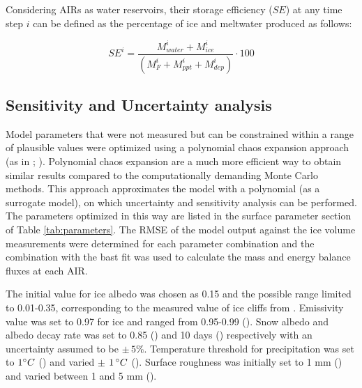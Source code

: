 \documentclass[utf8]{frontiersSCNS} %
\begin{document}
 Considering AIRs as water reservoirs, their storage efficiency ($SE$) at any time step $i$ can be defined as the
 percentage of ice and meltwater produced as follows:

\begin{equation} \textit{SE}^i = \frac{M_{water}^i+M_{ice}^i}{(M_F^i+M_{ppt}^i+M_{dep}^i)} \cdot 100 \end{equation}


\subsection{Sensitivity and Uncertainty analysis}
Model parameters that were not measured but can be constrained within a range of plausible values were optimized using a
polynomial chaos expansion approach (as in \cite{uncertainpy_2018}; \cite{Xiu_2005}). Polynomial chaos expansion are a
much more efficient way to obtain similar results compared to the computationally demanding Monte Carlo methods. This
approach approximates the model with a polynomial (as a surrogate model), on which uncertainty and sensitivity analysis
can be performed. The parameters optimized in this way are listed in the surface parameter section of Table
\ref{tab:parameters}. The RMSE of the model output against the ice volume measurements were determined for each
parameter combination and the combination with the bast fit was used to calculate the mass and energy balance fluxes at
each AIR.

The initial value for ice albedo was chosen as 0.15 and the possible range limited to 0.01-0.35, corresponding to the
measured value of ice cliffs from \cite{steiner_2015}. Emissivity value was set to 0.97 for ice and ranged from
0.95-0.99 (\cite{steiner_2015}). Snow albedo and albedo decay rate was set to 0.85 (\cite{CuffeyPaterson_2010}) and 10
days (\cite{Schmidt_2017}) respectively with an uncertainty assumed to be $\pm \,5 \%$. Temperature threshold for
precipitation was set to $1 \degree C$ (\cite{FujitaAgeta_2000}) and varied $\pm$ $1\,\degree C$ (\cite{Zhou_2010}).
Surface roughness was initially set to 1 mm (\cite{pellicciotti_2005}) and varied between 1 and 5 mm
(\cite{BrockWillisSharp_2006}). 
\end{document}
